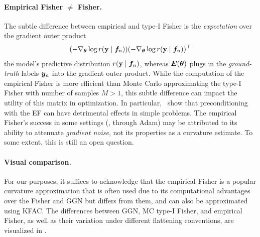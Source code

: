 \paragraph{Empirical Fisher $\neq$ Fisher.}
The subtle difference between empirical and type-I Fisher is the \emph{expectation} over the gradient outer product
\begin{align*}
  (-\nabla_{{\bm{\theta}}} \log r({\mathbf{y}} \mid {\bm{f}}_n))
  (-\nabla_{{\bm{\theta}}} \log r({\mathbf{y}} \mid {\bm{f}}_n))^{\top}
\end{align*}
\wrt the model's predictive distribution $r({\mathbf{y}} \mid {\bm{f}}_n)$, whereas ${\bm{E}}({\bm{\theta}})$ plugs in the \emph{ground-truth} labels ${\bm{y}}_n$ into the gradient outer product.
While the computation of the empirical Fisher is more efficient than Monte Carlo approximating the type-I Fisher with number of samples $M > 1$, this subtle difference can impact the utility of this matrix in optimization.
In particular,~\citet{kunstner2019limitations} show that preconditioning with the EF can have detrimental effects in simple problems.
The empirical Fisher's success in some settings (\eg, through Adam) may be attributed to its ability to attenuate \emph{gradient noise}, not its properties as a curvature estimate.
To some extent, this is still an open question.

\paragraph{Visual comparison.} For our purposes, it suffices to acknowledge that the empirical Fisher is a popular curvature approximation that is often used due to its computational advantages over the Fisher and GGN but differs from them, and can also be approximated using KFAC.
The differences between GGN, MC type-I Fisher, and empirical Fisher, as well as their variation under different flattening conventions, are visualized in .

